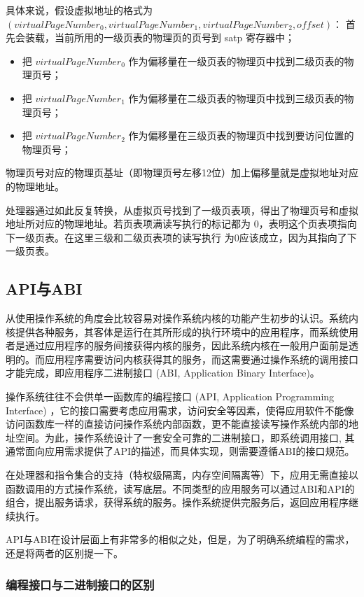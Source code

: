 具体来说，假设虚拟地址的格式为$(virtualPageNumber_{0} ,virtualPageNumber_{1},virtualPageNumber_{2},offset)$：
	首先会装载，当前所用的一级页表的物理页的页号到 satp 寄存器中；
    \begin{itemize}
	\item 把 $virtualPageNumber_{0}$ 作为偏移量在一级页表的物理页中找到二级页表的物理页号；
	\item 把 $virtualPageNumber_{1}$ 作为偏移量在二级页表的物理页中找到三级页表的物理页号；
	\item 把 $virtualPageNumber_{2}$ 作为偏移量在三级页表的物理页中找到要访问位置的物理页号；
    \end{itemize}

物理页号对应的物理页基址（即物理页号左移12位）加上偏移量就是虚拟地址对应的物理地址。

处理器通过如此反复转换，从虚拟页号找到了一级页表项，得出了物理页号和虚拟地址所对应的物理地址。若页表项满读写执行的标记都为 0，表明这个页表项指向下一级页表。在这里三级和二级页表项的读写执行 为0应该成立，因为其指向了下一级页表。


\subsection{API与ABI}

从使用操作系统的角度会比较容易对操作系统内核的功能产生初步的认识。系统内核提供各种服务，其客体是运行在其所形成的执行环境中的应用程序，而系统使用者是通过应用程序的服务间接获得内核的服务，因此系统内核在一般用户面前是透明的。而应用程序需要访问内核获得其的服务，而这需要通过操作系统的调用接口才能完成，即应用程序二进制接口 (ABI, Application Binary Interface)。

操作系统往往不会供单一函数库的编程接口 (API, Application Programming Interface) ，它的接口需要考虑应用需求，访问安全等因素，使得应用软件不能像访问函数库一样的直接访问操作系统内部函数，更不能直接读写操作系统内部的地址空间。为此，操作系统设计了一套安全可靠的二进制接口，即系统调用接口, 其通常面向应用需求提供了API的描述，而具体实现，则需要遵循ABI的接口规范。

在处理器和指令集合的支持（特权级隔离，内存空间隔离等）下，应用无需直接以函数调用的方式操作系统，读写底层。不同类型的应用服务可以通过ABI和API的组合，提出服务请求，获得系统的服务。操作系统提供完服务后，返回应用程序继续执行。

API与ABI在设计层面上有非常多的相似之处，但是，为了明确系统编程的需求，还是将两者的区别提一下。

\subsubsection*{编程接口与二进制接口的区别}

